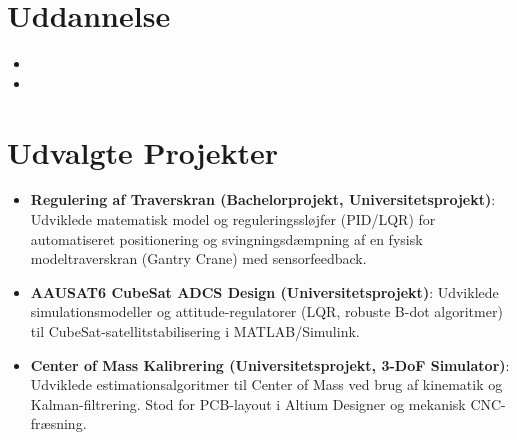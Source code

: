 \documentclass[11pt,a4paper,sans]{moderncv}
\begin{document}
\section{Uddannelse}
\vspace{1pt}
\begin{itemize}

\item{}

\vspace{3pt}

\item{}

\end{itemize}


\section{Udvalgte Projekter}
\vspace{1pt}
\begin{itemize}

\item{\textbf{Regulering af Traverskran (Bachelorprojekt, Universitetsprojekt)}: Udviklede matematisk model og reguleringssløjfer (PID/LQR) for automatiseret positionering og svingningsdæmpning af en fysisk modeltraverskran (Gantry Crane) med sensorfeedback.}

\item{\textbf{AAUSAT6 CubeSat ADCS Design (Universitetsprojekt)}: Udviklede simulationsmodeller og attitude-regulatorer (LQR, robuste B-dot algoritmer) til CubeSat-satellitstabilisering i MATLAB/Simulink.}

\item{\textbf{Center of Mass Kalibrering (Universitetsprojekt, 3-DoF Simulator)}: Udviklede estimationsalgoritmer til Center of Mass ved brug af kinematik og Kalman-filtrering. Stod for PCB-layout i Altium Designer og mekanisk CNC-fræsning.}

\end{itemize}
\end{document}
